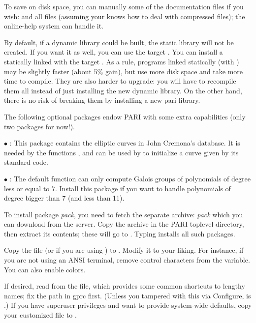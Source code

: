 To save on disk space, you can manually  some of the documentation
files if you wish:  and all  files (assuming your
 knows how to deal with compressed files); the online-help system
can handle it.

By default, if a dynamic library  could be built, the static
library  will not be created. If you want it as well, you can
use the target . You can install a statically
linked  with the target . As a rule,
programs linked statically (with ) may be slightly faster
(about 5\% gain), but use more disk space and take more time to compile.
They are also harder to upgrade: you will have to recompile them all instead
of just installing the new dynamic library. On the other hand, there is no
risk of breaking them by installing a new pari library.

 The following optional packages endow PARI with some
extra capabilities (only two packages for now!).

$\bullet$ : This package contains the elliptic curves in
John Cremona's database. It is needed by the functions ,
 and can be used by  to initialize a curve
given by its standard code.

$\bullet$ : The default  function can only
compute Galois groups of polynomials of degree less or equal to 7. Install
this package if you want to handle polynomials of degree bigger than 7 (and
less than 11). \medskip

To install package \emph{pack}, you need to fetch the separate archive:
\emph{pack} which you can download from the  server.
Copy the archive in the PARI toplevel directory, then extract its
contents; these will go to . Typing  installs all such packages.

 Copy the file  (or
 if you are using ) to . Modify
it to your liking. For instance, if you are not using an ANSI terminal,
remove control characters from the  variable. You can also
enable colors. 

If desired, read   from the 
file, which provides some common shortcuts to lengthy names; fix the path in
gprc first. (Unless you tampered with this via Configure,  is
.) If you have superuser privileges and want to
provide system-wide defaults, copy your customized  file to
.


